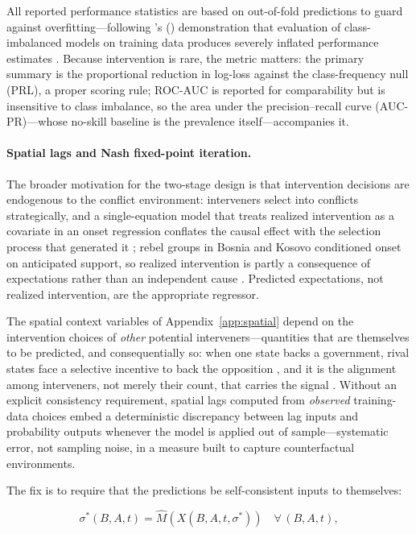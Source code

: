 All reported performance statistics are based on out-of-fold
predictions to guard against overfitting---following \citeauthor{wang2018}'s
(\citeyear{wang2018}) demonstration that
evaluation of class-imbalanced models on training data
produces severely inflated performance estimates \citep{muchlinski2016}.
Because intervention is rare, the metric matters: the primary summary is the
proportional reduction in log-loss against the class-frequency null (PRL), a
proper scoring rule; ROC-AUC is reported for comparability but is insensitive
to class imbalance, so the area under the precision--recall curve
(AUC-PR)---whose no-skill baseline is the prevalence itself---accompanies
it.

\paragraph{Spatial lags and Nash fixed-point iteration.}
The broader motivation for
the two-stage design is that intervention decisions are endogenous to the
conflict environment: interveners select into conflicts strategically, and
a single-equation model that treats realized intervention as a covariate in
an onset regression conflates the causal effect with the selection process
that generated it \citep{signorino2002,gent2008}; rebel groups in Bosnia and
Kosovo conditioned onset on anticipated support, so realized intervention is
partly a consequence of expectations rather than an independent cause
\citep{kuperman2008}.  Predicted expectations, not realized intervention, are
the appropriate regressor.

The spatial context variables of Appendix~\ref{app:spatial} depend on the
intervention choices of \textit{other} potential interveners---quantities
that are themselves to be predicted, and consequentially so: when one state
backs a government, rival states face a selective incentive to back the
opposition \citep{salehyan2011,findleyteo2006}, and it is the alignment
among interveners, not merely their count, that carries the signal
\citep{aydinregan2011}.  Without an explicit consistency requirement,
spatial lags computed from \textit{observed} training-data choices embed a
deterministic discrepancy between lag inputs and probability outputs
whenever the model is applied out of sample---systematic error, not sampling
noise, in a measure built to capture counterfactual environments.

The fix is to require that the predictions be self-consistent inputs to
themselves:

\begin{equation}
\sigma^*(B, A, t) = \hat{M}(X(B, A, t, \sigma^*)) \quad \forall\, (B, A, t),
\label{eq:fp}
\end{equation}

